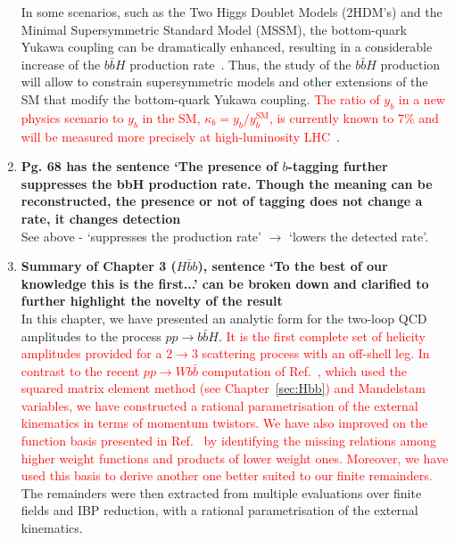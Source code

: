 \documentclass[main.tex]{subfiles}
\begin{document}
\begin{enumerate}
In some scenarios, such as the Two Higgs Doublet Models (2HDM's) and the Minimal
Supersymmetric Standard Model (MSSM), the bottom-quark Yukawa coupling can be dramatically enhanced,
resulting in a considerable increase of the $b\bar{b}H$ production
rate~\cite{Balazs:1998nt,Dawson:2005vi}.  Thus, the study of the $b\bar{b}H$ production will allow
to constrain supersymmetric models and other extensions of the SM that modify the bottom-quark
Yukawa coupling. \textcolor{red}{The ratio of $y_b$ in a new physics scenario to $y_b$ in the SM, $\kappa_b = y_b / y_b^{\text{SM}}$, is currently known to 7\% and will be measured more precisely at high-luminosity LHC~\cite{Cepeda:2019klc}}. 
\item \textbf{Pg. 68 has the sentence `The presence of $b$-tagging further suppresses the bbH
production rate. Though the meaning can be reconstructed, the presence or not of
tagging does not change a rate, it changes detection} \\
See above - `suppresses the production rate' $\rightarrow$ `lowers the detected rate'.

\item \textbf{Summary of Chapter 3 ($H\bar{b}b$), sentence `To the best of our knowledge this is the first...'
can be broken down and clarified to further highlight the novelty of the result}
\\
In this chapter, we have presented an analytic form for the two-loop QCD amplitudes to the process
$pp\to b\bar{b}H$. \textcolor{red}{It is the first complete set of helicity
amplitudes provided for a $2\to 3$ scattering process with an off-shell leg. In contrast to the recent $pp\to Wb\bar{b}$ computation of Ref.~\cite{Badger:2021nhg}, which used the squared matrix element method (see Chapter~\ref{sec:Hbb}) and Mandelstam variables, we have constructed a rational parametrisation of the external kinematics in terms of momentum twistors. We have also improved on the function basis presented in Ref.~\cite{Badger:2021nhg} by identifying the missing relations among higher weight functions and products of lower weight ones. Moreover, we have used this basis to derive another one better suited to our finite remainders.} The remainders were then extracted from multiple evaluations over finite fields and IBP reduction, with a rational parametrisation of the external kinematics.


\end{enumerate}
\end{document}
